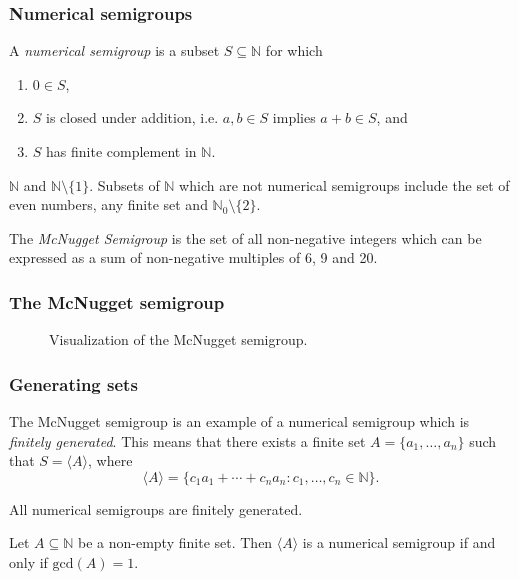 \documentclass{beamer}
\def\NN{\ensuremath{\mathbb{N}}}
\begin{document}
\begin{frame}
    \frametitle{Numerical semigroups}
    \begin{definition}\label{def:smgps}
        A \textit{numerical semigroup} is a subset $S \subseteq \NN$ for which 
        \begin{enumerate}
            \item $0 \in S$,
            \item $S$ is closed under addition, i.e. $a, b \in S$ implies $a + b \in S$, and
            \item $S$ has finite complement in $\NN$.
        \end{enumerate}
    \end{definition}
    \begin{example}
        $\NN$ and $\NN\setminus \{1\}$. Subsets of $\NN$ which are not numerical semigroups include the set of even numbers, any finite set and $\NN_0 \setminus \{2\}$.
    \end{example}
    
    \begin{example}\label{ex:smgps:mcnugget}
        The \textit{McNugget Semigroup} is the set of all non-negative integers which can be expressed as a sum of non-negative multiples of 6, 9 and 20.
    \end{example}
    
\end{frame}



\begin{frame}
    \frametitle{The McNugget semigroup}
    \begin{figure}
        \centering
        
        \caption{Visualization of the McNugget semigroup.}
        \label{fig:smgps:mcnugget}
    \end{figure}
\end{frame}

\begin{frame}
    \frametitle{Generating sets}
    The McNugget semigroup is an example of a numerical semigroup which is \textit{finitely generated}. This means that there exists a finite set $A = \{a_1, \ldots, a_n\}$ such that $S = \langle A \rangle$, where 
    \[\langle A \rangle = \{c_1a_1 + \cdots + c_na_n : c_1, \ldots, c_n \in \NN\}.\]  
    \begin{theorem}\label{thm:smgps:fin_gen}
        All numerical semigroups are finitely generated.
    \end{theorem}
    \begin{theorem}\label{thm:smgps:gcd}
        Let $A \subseteq \NN$ be a non-empty finite set. Then $\langle A \rangle$ is a numerical semigroup if and only if $\mathrm{gcd}(A) = 1$.    
    \end{theorem}
\end{frame}
\end{document}
